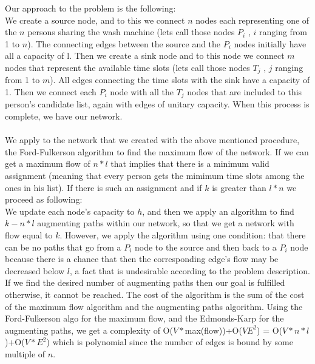 Our approach to the problem is the following:\\
We create a source node, and to this we connect $n$ nodes each representing one of the $n$ persons sharing the wash machine (lets call those nodes $P_i$ , $i$ ranging from 1 to $n$). The connecting edges between the source and the $P_i$ nodes initially have all a capacity of l. Then we create a sink node and to this node we connect $m$ nodes that represent the available time slots (lets call those nodes $T_j$ , $j$ ranging from 1 to $m$). All edges connecting the time slots with the sink have a capacity of 1. Then we connect each $P_i$ node with all the $T_j$ nodes that are included to this person's candidate list, again with edges of unitary capacity. When this process is complete, we have our network.\\
\\
We apply to the network that we created with the above mentioned procedure, the Ford-Fulkerson algorithm to find the maximum flow of the network. If we can get a maximum flow of $n*l$ that implies that there is a minimum valid assignment (meaning that every person gets the mimimum time slots among the ones in his list). If there is such an assignment and if $k$ is greater than $l*n$ we proceed as following:\\
We update each node's capacity to $h$, and then we apply an algorithm to find ${k-n*l}$ augmenting paths within our network, so that we get a network with flow equal to $k$. However, we apply the algorithm using one condition: that there can be no paths that go from a $P_i$ node to the source and then back to a $P_i$ node because there is a chance that then the corresponding edge's flow may be decreased below $l$, a fact that is undesirable according to the problem description.\\
If we find the desired number of augmenting paths then our goal is fulfilled otherwise, it cannot be reached. The cost of the algorithm is the sum of the cost of the maximum flow algorithm and the augmenting paths algorithm. Using the Ford-Fulkerson algo for the maximum flow, and the Edmonds-Karp for the augmenting paths, we get a complexity of O($V*$max(flow))+O($VE^2$) = O($V*n*l$)+O($V*E^2$) which is polynomial since the number of edges is bound by some multiple of $n$.
